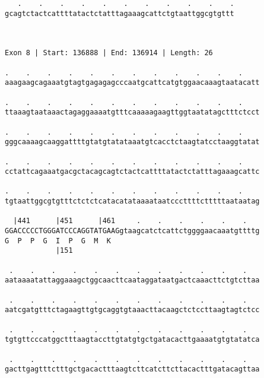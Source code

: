 \documentclass{article}
\begin{document}
\begin{Verbatim}
   .    .    .    .    .    .    .    .    .    .    .
gcagtctactcattttatactctatttagaaagcattctgtaattggcgtgttt
                                                      
                                                      
 
Exon 8 | Start: 136888 | End: 136914 | Length: 26
 
.    .    .    .    .    .    .    .    .    .    .    .    
aaagaagcagaaatgtagtgagagagcccaatgcattcatgtggaacaaagtaatacatt
                                                            
.    .    .    .    .    .    .    .    .    .    .    .    
ttaaagtaataaactagaggaaaatgtttcaaaaagaagttggtaatatagctttctcct
                                                            
.    .    .    .    .    .    .    .    .    .    .    .    
gggcaaaagcaaggattttgtatgtatataaatgtcacctctaagtatcctaaggtatat
                                                            
.    .    .    .    .    .    .    .    .    .    .    .    
cctattcagaaatgacgctacagcagtctactcattttatactctatttagaaagcattc
                                                            
.    .    .    .    .    .    .    .    .    .    .    .    
tgtaattggcgtgtttctctctcatacatataaaataatcccttttctttttaataatag
                                                            
  |441      |451      |461     .    .    .    .    .    .   
GGACCCCCTGGGATCCCAGGTATGAAGgtaagcatctcattctggggaacaaatgttttg
G  P  P  G  I  P  G  M  K                                   
            |151                                            
  
 .    .    .    .    .    .    .    .    .    .    .    .   
aataaaatattaggaaagctggcaacttcaataggataatgactcaaacttctgtcttaa
                                                            
 .    .    .    .    .    .    .    .    .    .    .    .   
aatcgatgtttctagaagttgtgcaggtgtaaacttacaagctctccttaagtagtctcc
                                                            
 .    .    .    .    .    .    .    .    .    .    .    .   
tgtgttcccatggctttaagtaccttgtatgtgctgatacacttgaaaatgtgtatatca
                                                            
 .    .    .    .    .    .    .    .    .    .    .    .   
gacttgagtttctttgctgacactttaagtcttcatcttcttacactttgatacagttaa
                                                            

\end{Verbatim}
\end{document}
